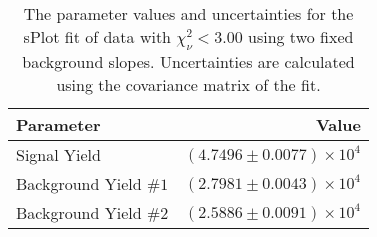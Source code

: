 
\begin{table}[ht]
    \begin{center}
        \begin{tabular}{lr}\toprule
            Parameter & Value \\\midrule
            Signal Yield & $(4.7496 \pm 0.0077) \times 10^{4}$ \\
            Background Yield $\#1$ & $(2.7981 \pm 0.0043) \times 10^{4}$ \\
            Background Yield $\#2$ & $(2.5886 \pm 0.0091) \times 10^{4}$ \\\bottomrule
        \end{tabular}
        \caption{The parameter values and uncertainties for the sPlot fit of data with $\chi^2_\nu < 3.00$ using two fixed background slopes. Uncertainties are calculated using the covariance matrix of the fit.}\label{tab:splot-fit-results-chisqdof-3.00-fixed-2}
    \end{center}
\end{table}

